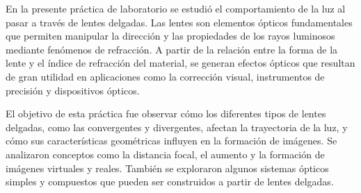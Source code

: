 En la presente práctica de laboratorio se estudió el comportamiento de la luz al pasar a través de lentes delgadas. Las lentes son elementos ópticos fundamentales que permiten manipular la dirección y las propiedades de los rayos luminosos mediante fenómenos de refracción. A partir de la relación entre la forma de la lente y el índice de refracción del material, se generan efectos ópticos que resultan de gran utilidad en aplicaciones como la corrección visual, instrumentos de precisión y dispositivos ópticos.

El objetivo de esta práctica fue observar cómo los diferentes tipos de lentes delgadas, como las convergentes y divergentes, afectan la trayectoria de la luz, y cómo sus características geométricas influyen en la formación de imágenes. Se analizaron conceptos como la distancia focal, el aumento y la formación de imágenes virtuales y reales. También se exploraron algunos sistemas ópticos simples y compuestos que pueden ser construidos a partir de lentes delgadas.